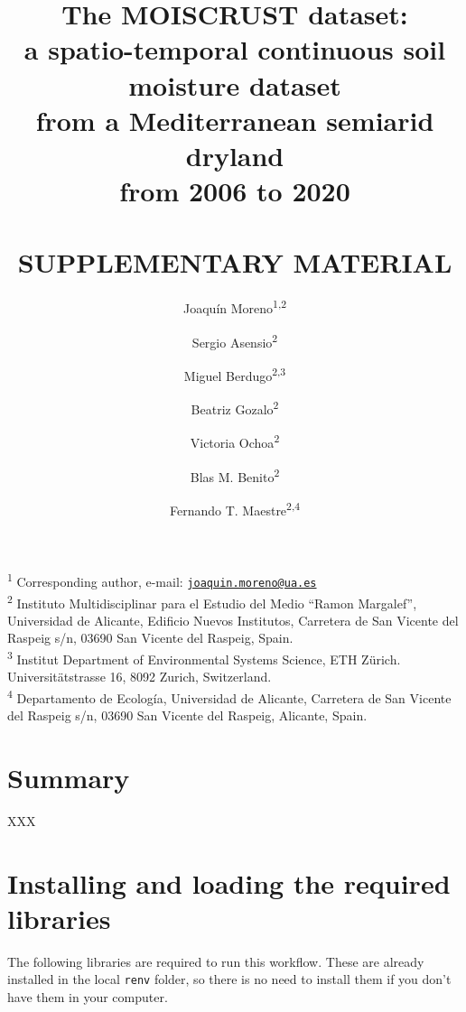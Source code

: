 \documentclass[]{article}
\title{The MOISCRUST dataset:\\
a spatio-temporal continuous soil moisture dataset\\
from a Mediterranean semiarid dryland\\
from 2006 to 2020\\
~\\
SUPPLEMENTARY MATERIAL}
\author{Joaquín Moreno\textsuperscript{1,2} \and Sergio Asensio\textsuperscript{2} \and Miguel Berdugo\textsuperscript{2,3} \and Beatriz Gozalo\textsuperscript{2} \and Victoria Ochoa\textsuperscript{2} \and Blas M. Benito\textsuperscript{2} \and Fernando T. Maestre\textsuperscript{2,4}}
\date{}
\begin{document}
\maketitle

{
\setcounter{tocdepth}{2}
\tableofcontents
}
\textsuperscript{1} Corresponding author, e-mail:
\href{mailto:joaquin.moreno@ua.es}{\nolinkurl{joaquin.moreno@ua.es}}\\
\textsuperscript{2} Instituto Multidisciplinar para el Estudio del Medio
``Ramon Margalef'', Universidad de Alicante, Edificio Nuevos Institutos,
Carretera de San Vicente del Raspeig s/n, 03690 San Vicente del Raspeig,
Spain.\\
\textsuperscript{3} Institut Department of Environmental Systems
Science, ETH Zürich. Universitätstrasse 16, 8092 Zurich, Switzerland.\\
\textsuperscript{4} Departamento de Ecología, Universidad de Alicante,
Carretera de San Vicente del Raspeig s/n, 03690 San Vicente del Raspeig,
Alicante, Spain.

\hypertarget{summary}{%
\section{Summary}\label{summary}}

XXX

\hypertarget{installing-and-loading-the-required-libraries}{%
\section{Installing and loading the required
libraries}\label{installing-and-loading-the-required-libraries}}

The following libraries are required to run this workflow. These are
already installed in the local \texttt{renv} folder, so there is no need
to install them if you don't have them in your computer.
\end{document}
